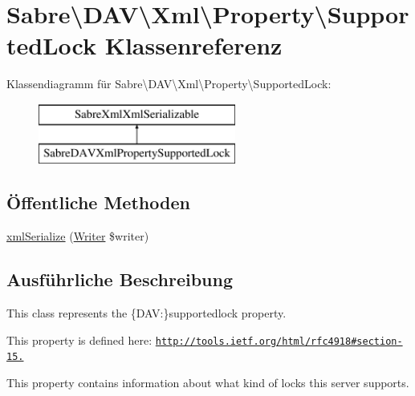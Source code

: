\hypertarget{class_sabre_1_1_d_a_v_1_1_xml_1_1_property_1_1_supported_lock}{}\section{Sabre\textbackslash{}D\+AV\textbackslash{}Xml\textbackslash{}Property\textbackslash{}Supported\+Lock Klassenreferenz}
\label{class_sabre_1_1_d_a_v_1_1_xml_1_1_property_1_1_supported_lock}
Klassendiagramm für Sabre\textbackslash{}D\+AV\textbackslash{}Xml\textbackslash{}Property\textbackslash{}Supported\+Lock\+:\begin{figure}[H]
\begin{center}
\leavevmode
\includegraphics[height=2.000000cm]{class_sabre_1_1_d_a_v_1_1_xml_1_1_property_1_1_supported_lock}
\end{center}
\end{figure}
\subsection*{Öffentliche Methoden}
\begin{DoxyCompactItemize}
\item 
\mbox{\hyperlink{class_sabre_1_1_d_a_v_1_1_xml_1_1_property_1_1_supported_lock_a0d0f874b272baaee90e2b8dc6da386da}{xml\+Serialize}} (\mbox{\hyperlink{class_sabre_1_1_xml_1_1_writer}{Writer}} \$writer)
\end{DoxyCompactItemize}


\subsection{Ausführliche Beschreibung}
This class represents the \{D\+AV\+:\}supportedlock property.

This property is defined here\+: \href{http://tools.ietf.org/html/rfc4918#section-15.10}{\tt http\+://tools.\+ietf.\+org/html/rfc4918\#section-\/15.}

This property contains information about what kind of locks this server supports.

